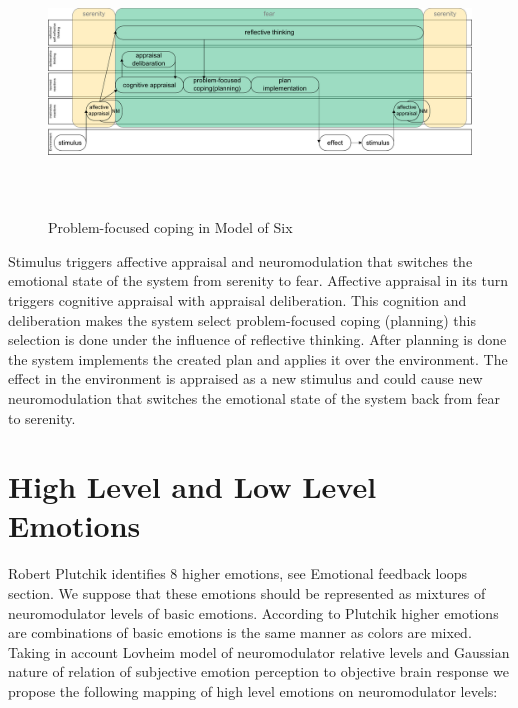 \begin{figure}
\begin{center}
 \includegraphics[height=7cm, angle=90]{figure4_coping}
\end{center}
\caption{Problem-focused coping in Model of Six}
\end{figure}

Stimulus triggers affective appraisal and neuromodulation that switches the emotional state of the system from serenity to fear. Affective appraisal in its turn triggers cognitive appraisal with appraisal deliberation. This cognition and deliberation makes the system select problem-focused coping (planning) this selection is done under the influence of reflective thinking. After planning is done the system implements the created plan and applies it over the environment. The effect in the environment is appraised as a new stimulus and could cause new neuromodulation that switches the emotional state of the system back from fear to serenity.

\section{High Level and Low Level Emotions}

Robert Plutchik \cite{natureofemotions} identifies 8 higher emotions, see Emotional feedback loops section. We suppose that these emotions should be represented as mixtures of neuromodulator levels of basic emotions. According to Plutchik higher emotions are combinations of basic emotions is the same manner as colors are mixed. Taking in account Lovheim model of neuromodulator relative levels and Gaussian nature of relation of subjective emotion perception to objective brain response \cite{senticcomputing, neuralcorrelatesofhate} we propose the following mapping of high level emotions on neuromodulator levels:

